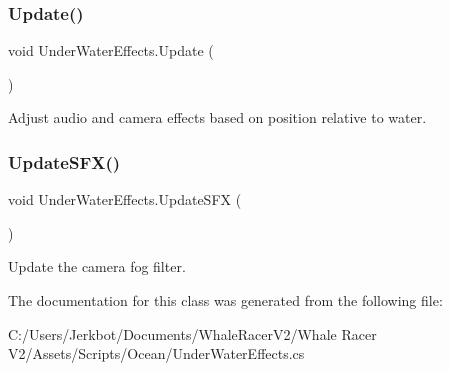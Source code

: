\subsubsection{\texorpdfstring{Update()}{Update()}}
{\footnotesize\ttfamily void Under\+Water\+Effects.\+Update (\begin{DoxyParamCaption}{ }\end{DoxyParamCaption})\hspace{0.3cm}{\ttfamily [private]}}



Adjust audio and camera effects based on position relative to water. 

\mbox{\label{class_under_water_effects_a1bfea80ef5580028dfb091bf3199c5fc}} 
\subsubsection{\texorpdfstring{Update\+S\+F\+X()}{UpdateSFX()}}
{\footnotesize\ttfamily void Under\+Water\+Effects.\+Update\+S\+FX (\begin{DoxyParamCaption}{ }\end{DoxyParamCaption})\hspace{0.3cm}{\ttfamily [private]}}



Update the camera fog filter. 



The documentation for this class was generated from the following file\+:\begin{DoxyCompactItemize}
\item 
C\+:/\+Users/\+Jerkbot/\+Documents/\+Whale\+Racer\+V2/\+Whale Racer V2/\+Assets/\+Scripts/\+Ocean/Under\+Water\+Effects.\+cs\end{DoxyCompactItemize}
